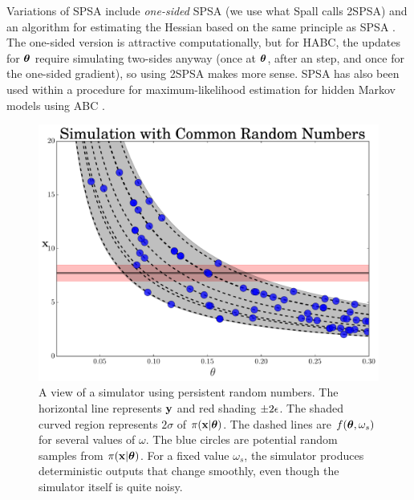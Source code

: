 \documentclass[]{article}
\begin{document}
Variations of SPSA include {\em one-sided} SPSA \cite{spall2000adaptive} (we use what Spall calls 2SPSA) and an algorithm for estimating the Hessian based on the same principle as SPSA \cite{spall2005monte}.   The one-sided version is attractive computationally, but for HABC, the updates for ${\bm \theta}$ require simulating two-sides anyway (once at ${\bm \theta}$, after an step, and once for the one-sided gradient), so using 2SPSA makes more sense.  SPSA has also been used within a procedure for maximum-likelihood estimation for hidden Markov models using ABC \cite{Ehrlich2013}.

\begin{figure}[t]
\vskip 0.2in
\begin{center}
\includegraphics[width=0.75\columnwidth]{./images/exp_crn_figure.pdf}
\vspace{-0.1in}
\caption{\small{A view of a simulator using persistent random numbers.  The horizontal line represents ${\bf y}$ and red shading $\pm 2\epsilon$.  The shaded curved region represents $2\sigma$ of $\pi({\bf x}|{\bm \theta})$.  The dashed lines are $f({\bm \theta}, \omega_s)$ for several values of $\omega$.  The blue circles are potential random samples from $\pi({\bf x}|{\bm \theta})$.  For a fixed value $\omega_s$, the simulator produces deterministic outputs that change smoothly, even though the simulator itself is quite noisy.}}
\label{fig:exp-crns}
\end{center}
\vspace{-0.2in}
\end{figure} 
\end{document}
